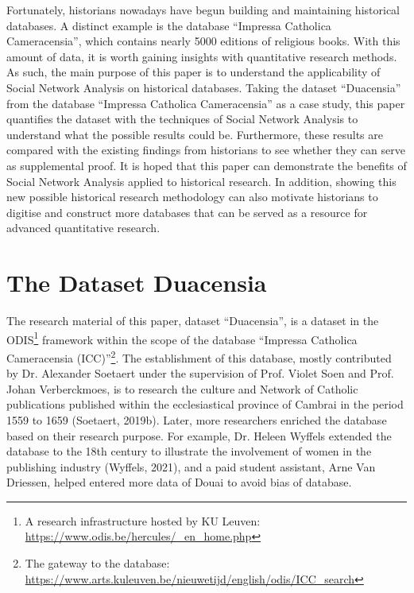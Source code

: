 \documentclass[12pt,a4paper,oneside]{book}
\begin{document}
\begin{sloppypar}
Fortunately, historians nowadays have begun building and maintaining historical databases. A distinct example is the database “Impressa Catholica Cameracensia”, which contains nearly 5000 editions of religious books. With this amount of data, it is worth gaining insights with quantitative research methods. As such, the main purpose of this paper is to understand the applicability of Social Network Analysis on historical databases. Taking the dataset “Duacensia” from the database “Impressa Catholica Cameracensia” as a case study, this paper quantifies the dataset with the techniques of Social Network Analysis to understand what the possible results could be. Furthermore, these results are compared with the existing findings from historians to see whether they can serve as supplemental proof. It is hoped that this paper can demonstrate the benefits of Social Network Analysis applied to historical research. In addition, showing this new possible historical research methodology can also motivate historians to digitise and construct more databases that can be served as a resource for advanced quantitative research.

\chapter{The Dataset Duacensia}
\label{Duacensia}
The research material of this paper, dataset “Duacensia”, is a dataset in the ODIS\footnote{A research infrastructure hosted by KU Leuven: \url{https://www.odis.be/hercules/_en_home.php}} framework within the scope of the database “Impressa Catholica Cameracensia (ICC)”\footnote{The gateway to the database: \url{https://www.arts.kuleuven.be/nieuwetijd/english/odis/ICC_search}}. The establishment of this database, mostly contributed by Dr. Alexander Soetaert under the supervision of Prof. Violet Soen and Prof. Johan Verberckmoes, is to research the culture and Network of Catholic publications published within the ecclesiastical province of Cambrai in the period 1559 to 1659 (Soetaert, 2019b). Later, more researchers enriched the database based on their research purpose. For example, Dr. Heleen Wyffels extended the database to the 18th century to illustrate the involvement of women in the publishing industry (Wyffels, 2021), and a paid student assistant, Arne Van Driessen, helped entered more data of Douai to avoid bias of database.


\end{sloppypar}
\end{document}
